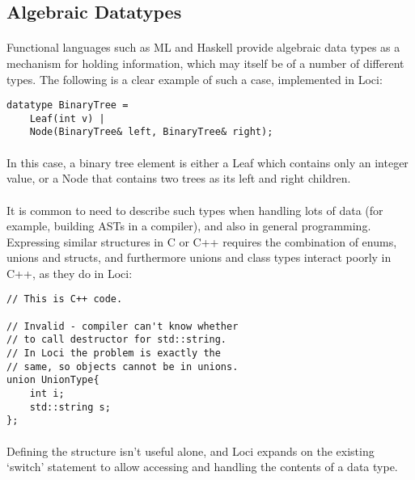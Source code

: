 \documentclass[12pt,twoside,notitlepage]{report}
\begin{document}
\clearpage

\subsection{Algebraic Datatypes}

\paragraph{}
Functional languages such as ML and Haskell provide algebraic data types as a mechanism for holding information, which may itself be of a number of different types. The following is a clear example of such a case, implemented in Loci:

\begin{lstlisting}
datatype BinaryTree =
	Leaf(int v) |
	Node(BinaryTree& left, BinaryTree& right);
\end{lstlisting}

\paragraph{}
In this case, a binary tree element is either a Leaf which contains only an integer value, or a Node that contains two trees as its left and right children.

\paragraph{}
It is common to need to describe such types when handling lots of data (for example, building ASTs in a compiler), and also in general programming. Expressing similar structures in C or C++ requires the combination of enums, unions and structs, and furthermore unions and class types interact poorly in C++, as they do in Loci:

\begin{lstlisting}
// This is C++ code.

// Invalid - compiler can't know whether
// to call destructor for std::string.
// In Loci the problem is exactly the
// same, so objects cannot be in unions.
union UnionType{
	int i;
	std::string s;
};
\end{lstlisting}

\paragraph{}
Defining the structure isn't useful alone, and Loci expands on the existing `switch' statement to allow accessing and handling the contents of a data type.
\end{document}
